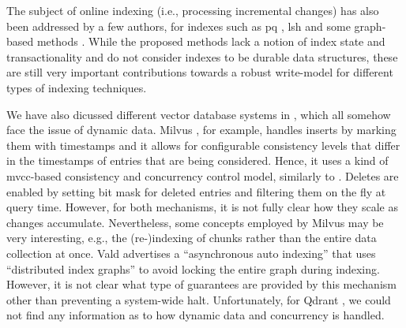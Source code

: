 The subject of online indexing (i.e., processing incremental changes) has also been addressed by a few authors, for indexes such as \acrshort{pq} \cite{Xu:2018Online}, \acrshort{lsh} \cite{Cakir:2015Adaptive} and some graph-based methods \cite{Zhao:2022Approximate}. While the proposed methods lack a notion of index state and transactionality and do not consider indexes to be durable data structures, these are still very important contributions towards a robust write-model for different types of indexing techniques. 

We have also dicussed different vector database systems in , which all somehow face the issue of dynamic data. Milvus \cite{Wang:2021Milvus}, for example, handles inserts by marking them with timestamps and it allows for configurable consistency levels that differ in the timestamps of entries that are being considered. Hence, it uses a kind of \acrshort{mvcc}-based consistency and concurrency control model, similarly to \cottontail. Deletes are enabled by setting bit mask for deleted entries and filtering them on the fly at query time. However, for both mechanisms, it is not fully clear how they scale as changes accumulate. Nevertheless, some concepts employed by Milvus may be very interesting, e.g., the (re-)indexing of chunks rather than the entire data collection at once. Vald  advertises a ``asynchronous auto indexing'' that uses ``distributed index graphs'' to avoid locking the entire graph during indexing. However, it is not clear what type of guarantees are provided by this mechanism other than preventing a system-wide halt. Unfortunately, for Qdrant  , we could not find any information as to how dynamic data and concurrency is handled.


